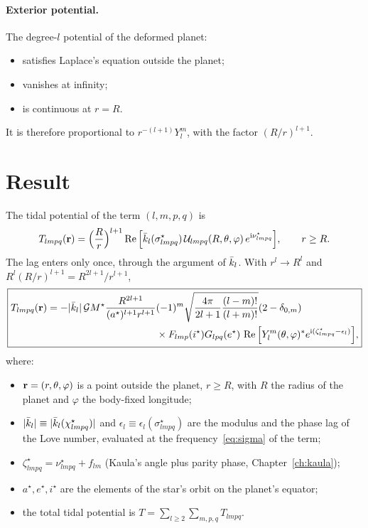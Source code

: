 \paragraph{Exterior potential.} The degree-$l$ potential of the deformed planet:
\begin{itemize}
  \item satisfies Laplace's equation outside the planet;
  \item vanishes at infinity;
  \item is continuous at $r=R$.
\end{itemize}
It is therefore proportional to $r^{-(l+1)}Y_l^m$, with the factor $(R/r)^{l+1}$.

\section{Result}
The tidal potential of the term $(l,m,p,q)$ is
\begin{equation}
  T_{lmpq}(\mathbf r)=\Big(\frac{R}{r}\Big)^{l+1}\operatorname{Re}\Big[\bar k_l(\sigma^\star_{lmpq})\,\mathcal U_{lmpq}(R,\theta,\varphi)\,e^{\mathrm{i}\nu^\star_{lmpq}}\Big],\qquad r\ge R. \label{eq:T-def}
\end{equation}
The lag enters only once, through the argument of $\bar k_l$. With $r^l\to R^l$ and $R^l(R/r)^{l+1}=R^{2l+1}/r^{l+1}$,
\begin{equation}
  \boxed{\begin{aligned}T_{lmpq}(\mathbf r)=-|\bar k_l|\,\mathcal{G} M^\star\frac{R^{2l+1}}{(a^\star)^{l+1}r^{l+1}}&(-1)^m\sqrt{\frac{4\pi}{2l+1}\frac{(l-m)!}{(l+m)!}}(2-\delta_{0,m})\\
  &\times F_{lmp}(i^\star)G_{lpq}(e^\star)\,\operatorname{Re}\Big[Y_l^m(\theta,\varphi)^*e^{\mathrm{i}(\zeta^\star_{lmpq}-\epsilon_l)}\Big],\end{aligned}} \label{eq:T-complex}
\end{equation}
where:
\begin{itemize}
  \item $\mathbf r=(r,\theta,\varphi)$ is a point outside the planet, $r\ge R$, with $R$ the radius of the planet and $\varphi$ the body-fixed longitude;
  \item $|\bar k_l|\equiv|\bar k_l(\chi^\star_{lmpq})|$ and $\epsilon_l\equiv\epsilon_l(\sigma^\star_{lmpq})$ are the modulus and the phase lag of the Love number, evaluated at the frequency~\eqref{eq:sigma} of the term;
  \item $\zeta^\star_{lmpq}=\nu^\star_{lmpq}+f_{lm}$ (Kaula's angle plus parity phase, Chapter~\ref{ch:kaula});
  \item $a^\star,e^\star,i^\star$ are the elements of the star's orbit on the planet's equator;
  \item the total tidal potential is $T=\sum_{l\ge2}\sum_{m,p,q}T_{lmpq}$.
\end{itemize}

